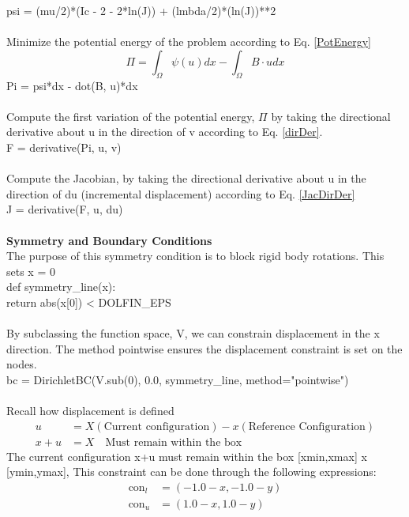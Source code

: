 \documentclass[12pt,3p]{article}
\begin{document}
{\selectfont
psi = (mu/2)*(Ic - 2 - 2*ln(J)) + (lmbda/2)*(ln(J))**2 \\ \\
}
Minimize the potential energy of the problem according to Eq. \ref{PotEnergy}
\begin{equation*}
\Pi = \int_{\Omega} \psi(u) dx - \int_{\Omega} B \cdot u dx
\end{equation*}
{\selectfont
Pi = psi*dx - dot(B, u)*dx \\ \\
}
Compute the first variation of the potential energy, $\Pi$ by taking the directional derivative about u in the direction of v according to Eq. \ref{dirDer}. \\ 
{\selectfont
F = derivative(Pi, u, v) \\ \\
} 
Compute the Jacobian, by taking the directional derivative about u in the direction of du (incremental displacement) according to Eq. \ref{JacDirDer} \\
{\selectfont
J = derivative(F, u, du) \\ \\
}
\textbf{Symmetry and Boundary Conditions} \\
The purpose of this symmetry condition is to block rigid body rotations. This sets x = 0\\
{\selectfont
def symmetry\_line(x): \\
\indent return abs(x[0]) < DOLFIN\_EPS \\ \\
}
By subclassing the function space, V, we can constrain displacement in the x direction. The method {\selectfont pointwise} ensures the displacement constraint is set on the nodes. \\
{\selectfont
bc = DirichletBC(V.sub(0), 0.0, symmetry\_line, method="pointwise") \\ \\
}
Recall how displacement is defined 
\begin{align*}
u &= X (\text{Current configuration}) - x (\text{Reference Configuration}) \\
x + u	&= X \quad \text{Must remain within the box }
\end{align*}
The current configuration x+u must remain within the box [xmin,xmax] x [ymin,ymax], This constraint can be done through the following expressions: 
\begin{align*}
\text{con}_l &= (-1.0-x, -1.0-y) \\
\text{con}_u &= (1.0-x, 1.0-y)
\end{align*}
\end{document}
